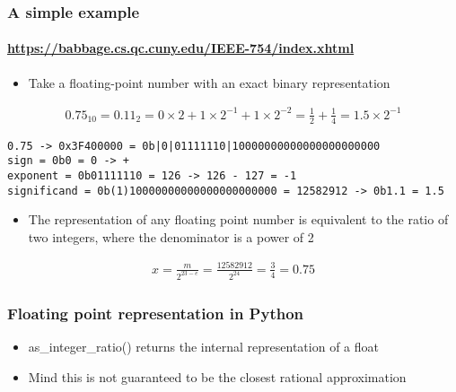 \documentclass[9pt]{beamer}
\begin{document}
\begin{frame}[fragile]
  \frametitle{A simple example}
  \framesubtitle{\url{https://babbage.cs.qc.cuny.edu/IEEE-754/index.xhtml}}
  \begin{itemize}
  \item Take a floating-point number with an exact binary representation
  \end{itemize}
  \begin{align}
    0.75_{10} = 0.11_{2} = 0 \times 2 + 1 \times 2^{-1} + 1 \times 2^{-2} =
    \frac{1}{2} + \frac{1}{4} = 1.5 \times 2^{-1}
  \end{align}

  \begin{Verbatim}
0.75 -> 0x3F400000 = 0b|0|01111110|10000000000000000000000
sign = 0b0 = 0 -> +
exponent = 0b01111110 = 126 -> 126 - 127 = -1
significand = 0b(1)10000000000000000000000 = 12582912 -> 0b1.1 = 1.5
  \end{Verbatim}  
  \begin{itemize}
  \item The representation of any floating point number is equivalent to the
    ratio of two integers, where the denominator is a power of 2
  \end{itemize}

  \begin{align}
    x = \frac{m}{2^{23 - e}} = \frac{12582912}{2^{24}} = \frac{3}{4} = 0.75
  \end{align}
\end{frame}


\begin{frame}[fragile]
  \frametitle{Floating point representation in Python}
  

  \begin{itemize}
  \item as\_integer\_ratio() returns the internal representation of a float
  \item Mind this is not guaranteed to be the closest rational approximation
  \end{itemize}
\end{frame}
\end{document}

